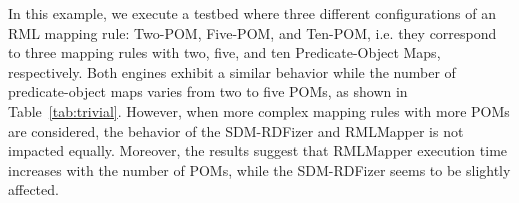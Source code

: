 In this example, we execute a testbed where three different configurations of an RML mapping rule: Two-POM, Five-POM, and Ten-POM, i.e. they correspond to three mapping rules with two, five, and ten Predicate-Object Maps, respectively. 
Both engines exhibit a similar behavior while the number of predicate-object maps varies from two to five POMs, as shown in Table~\ref{tab:trivial}. However, when more complex mapping rules with more POMs are considered, the behavior of the SDM-RDFizer and RMLMapper is not impacted equally. Moreover, the results suggest that RMLMapper execution time increases with the number of POMs, while the SDM-RDFizer seems to be slightly affected. 
